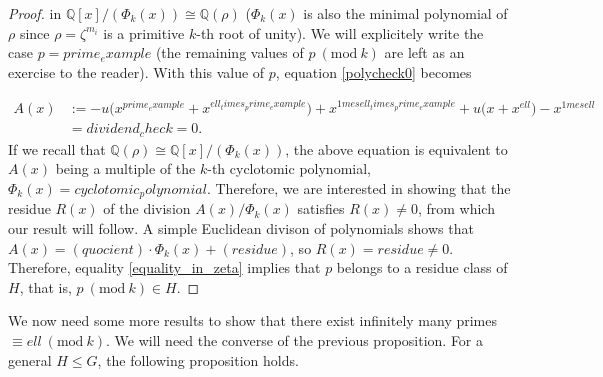 \documentclass[a4paper, 12pt]{article}
\theoremstyle{definition}
\theoremstyle{remark}
\newcommand{\Q}{\ensuremath{\mathbb{Q}}}
\newcommand{\Mod}[1]{\ (\mathrm{mod}\ #1)} %
\begin{document}
\begin{proof}
in $\Q[x]/(\Phi_{{k}}(x))\cong\Q(\rho)$ ($\Phi_{{k}}(x)$ is also the minimal polynomial of $\rho$ since $\rho=\zeta^{m_i}$ is a primitive ${k}$-th root of unity). We will explicitely write the case $p={prime_example}$ (the remaining values of $p \Mod{{k}}$ are left as an exercise to the reader). With this value of $p$, equation \eqref{polycheck0} becomes

\begin{align*}
A(x)&:=-{u}\big(x^{{prime_example}}+x^{{ell_times_prime_example}}\big)+x^{{1mesell_times_prime_example}}+{u}\big(x+x^{{ell}}\big)-x^{{1mesell}}\\
&={dividend_check}=0.
\end{align*}
If we recall that $\Q(\rho)\cong\Q[x]/(\Phi_{{k}}(x))$, the above equation is equivalent to $A(x)$ being a multiple of the ${k}$-th cyclotomic polynomial, $\Phi_{{k}}(x) = {cyclotomic_polynomial}$. Therefore, we are interested in showing that the residue $R(x)$ of the division $A(x)/\Phi_{{k}}(x)$ satisfies $R(x)\neq 0$, from which our result will follow. A simple Euclidean divison of polynomials shows that $A(x)=({quocient})\cdot\Phi_{{k}}(x)+({residue})$, so $R(x)={residue} \neq 0$. Therefore, equality \eqref{equality_in_zeta} implies that $p$ belongs to a residue class of $H$, that is, $p \Mod{{k}} \in H$.
\end{proof}

We now need some more results to show that there exist infinitely many primes $\equiv {ell}\Mod{{k}}$. We will need the converse of the previous proposition. For a general $H\leqslant G$, the following proposition holds.
\end{document}
